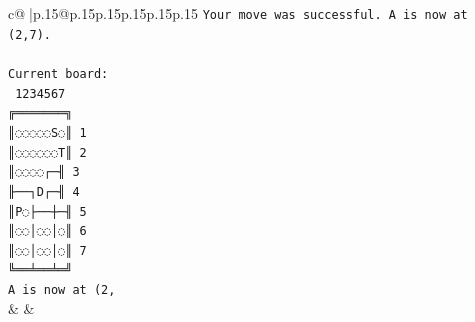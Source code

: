 \documentclass{article}
\begin{document}
{\begin{supertabular}{c@{$\;$}|p{.15\linewidth}@{}p{.15\linewidth}p{.15\linewidth}p{.15\linewidth}p{.15\linewidth}p{.15\linewidth}}
{{{\texttt{Your move was successful. A is now at (2,7).} \\
\\ 
\texttt{Current board:} \\
\texttt{ 1234567} \\
\texttt{╔═══════╗} \\
\texttt{║◌◌◌◌◌S◌║ 1} \\
\texttt{║◌◌◌◌◌◌T║ 2} \\
\texttt{║◌◌◌◌┌─╢ 3} \\
\texttt{╟──┐D┌─╢ 4} \\
\texttt{║P◌├──┼─╢ 5} \\
\texttt{║◌◌│◌◌│◌║ 6} \\
\texttt{║◌◌│◌◌│◌║ 7} \\
\texttt{╚══╧══╧═╝} \\
\texttt{A is now at (2,} \\
            }
        }
    }
    & & \\ \\


\end{supertabular}}
\end{document}
